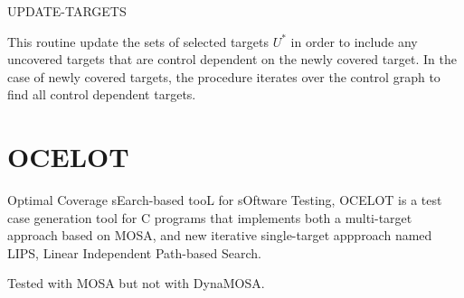 \begin{algorithm}[H]
    \caption{UPDATE-TARGETS}


    \DontPrintSemicolon   

    
     {
    }
\end{algorithm}

This routine update the sets of selected targets $ U^* $ in order to include any uncovered targets that are control dependent on the newly covered target.
In the case of newly covered targets, the procedure iterates over the control graph to find all control dependent targets.




\newpage
\section{OCELOT}
Optimal Coverage sEarch-based tooL for sOftware Testing, OCELOT \cite{DBLP:conf/ssbse/ScalabrinoGNOL16} is a test case generation tool for C programs that implements both a multi-target approach based on MOSA, and new iterative single-target appproach named LIPS, Linear Independent Path-based Search.

Tested with MOSA but not with DynaMOSA.